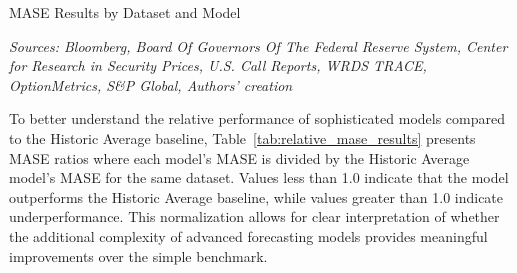 \documentclass{article}
\begin{document}
\begin{table}[htbp]
\centering
\caption{MASE Results by Dataset and Model}
\label{tab:mase_results}

\caption*{
\scriptsize
\emph{Sources: Bloomberg, Board Of Governors Of The Federal Reserve System, Center for Research in Security Prices, U.S. Call Reports, WRDS TRACE, OptionMetrics, S\&P Global,  Authors' creation}}
\end{table}




To better understand the relative performance of sophisticated models compared to the Historic Average baseline, Table~\ref{tab:relative_mase_results} presents MASE ratios where each model's MASE is divided by the Historic Average model's MASE for the same dataset. Values less than 1.0 indicate that the model outperforms the Historic Average baseline, while values greater than 1.0 indicate underperformance. This normalization allows for clear interpretation of whether the additional complexity of advanced forecasting models provides meaningful improvements over the simple benchmark.
\end{document}

